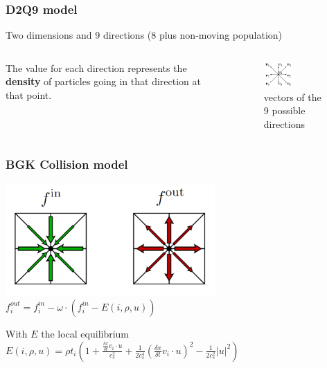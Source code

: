 \documentclass{beamer}
\begin{document}
\begin{frame}[fragile]
\frametitle{D2Q9 model}
\vfill
Two dimensions and 9 directions (8 plus non-moving population)\\
\bigskip\bigskip\bigskip\bigskip
\begin{columns}[t]

The value for each direction represents the \textbf{density} of particles going in that direction at that point.\\

\begin{center}
\begin{figure}
\includegraphics[width=0.45\textwidth]{img/d2q9.png}
\caption{vectors of the 9 possible directions}
\end{figure}
\end{center}

\end{columns}
\vfill
\end{frame}


\begin{frame}[fragile]
\frametitle{BGK Collision model}
\begin{center}
\includegraphics[width=0.6\textwidth]{img/col.png}\\
\bigskip
{\large $f_{i}^{out} =f_{i}^{in}-\omega\cdot (f_{i}^{in}-E(i,\rho , u))$}
\end{center}
\bigskip
With $E$ the local equilibrium
$E(i,\rho , u) = \rho t_{i} (1+\frac{\frac{\delta x}{\delta t}v_{i}\cdot u}{c_{s}^2}+\frac{1}{2c_{s}^{4}}(\frac{\delta x}{\delta t}v_{i}\cdot u)^{2}-\frac{1}{2c_{s}^2}\vert u\vert ^{2})$
\end{frame}
\end{document}
